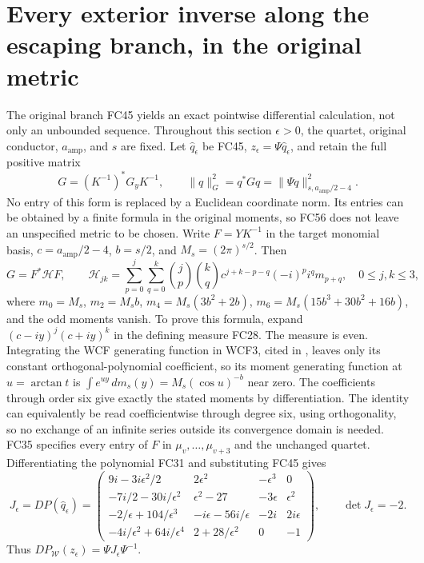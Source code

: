 \section{Every exterior inverse along the escaping branch, in the original metric}
The original branch FC45 yields an exact pointwise differential calculation,
not only an unbounded sequence. Throughout this section $\epsilon>0$, the
quartet, original conductor, $a_{\mathrm{amp}}$, and $s$ are fixed. Let
$\widehat q_\epsilon$ be FC45, $z_\epsilon=\Psi\widehat q_\epsilon$,
and retain the full positive matrix
\[
 G=(K^{-1})^*G_yK^{-1},\qquad
 \|q\|_G^2=q^*Gq=\|\Psi q\|_{s,a_{\mathrm{amp}}/2-4}^2.
 \tag{FC56}
\]
No entry of this form is replaced by a Euclidean coordinate norm.
Its entries can be obtained by a finite formula in the original moments,
so FC56 does not leave an unspecified metric to be chosen. Write
$F=YK^{-1}$ in the target monomial basis, $c=a_{\mathrm{amp}}/2-4$,
$b=s/2$, and $M_s=(2\pi)^{s/2}$. Then
\[
 G=F^*\mathcal H F,\qquad
 \mathcal H_{jk}=\sum_{p=0}^j\sum_{q=0}^k
 \binom jp\binom kq c^{j+k-p-q}(-i)^p i^q m_{p+q},
 \quad 0\le j,k\le3,
 \tag{FC56a}
\]
where $m_0=M_s$, $m_2=M_sb$, $m_4=M_s(3b^2+2b)$,
$m_6=M_s(15b^3+30b^2+16b)$, and the odd moments vanish.
To prove this formula, expand
$(c-iy)^j(c+iy)^k$ in the defining measure FC28. The measure is
even. Integrating the WCF generating function in WCF3, cited in
\cite{fullfable:WCF}, leaves only its constant orthogonal-polynomial coefficient,
so its moment generating function at $u=\arctan t$ is
$\int e^{uy}\,dm_s(y)=M_s(\cos u)^{-b}$ near zero. The coefficients
through order six give exactly the stated moments by differentiation.
The identity can equivalently be read coefficientwise through degree
six, using orthogonality, so no exchange of an infinite series outside
its convergence domain is needed. FC35 specifies every entry of $F$
in $\mu_v,\ldots,\mu_{v+3}$ and the unchanged quartet.
Differentiating the polynomial FC31 and substituting FC45 gives
\[
 J_\epsilon=DP(\widehat q_\epsilon)=
 \begin{pmatrix}
 9i-3i\epsilon^2/2&2\epsilon^2&-\epsilon^3&0\\
 -7i/2-30i/\epsilon^2&\epsilon^2-27&-3\epsilon&\epsilon^2\\
 -2/\epsilon+104/\epsilon^3&-i\epsilon-56i/\epsilon&-2i&2i\epsilon\\
 -4i/\epsilon^2+64i/\epsilon^4&2+28/\epsilon^2&0&-1
 \end{pmatrix},\qquad \det J_\epsilon=-2.
 \tag{FC57}
\]
Thus $D P_{\mathcal W}(z_\epsilon)=\Psi J_\epsilon\Psi^{-1}$.
